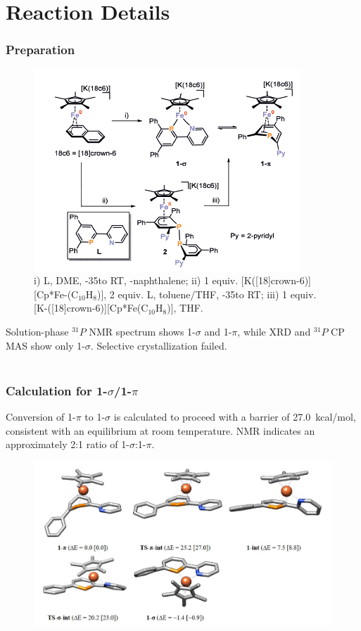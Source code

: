 \documentclass[10pt,aspectratio=43]{beamer}
\numberwithin{equation}{section}
\begin{document}
\section{Reaction Details}
\begin{frame}
\frametitle{Preparation}
\begin{figure}
	\centering
	\includegraphics[width=0.7\linewidth]{prep.jpg}
	\caption{i) L, DME, -35\textcelsius to RT, -naphthalene;
		     ii) 1 equiv. [K([18]crown-6)][Cp*Fe-(C$ _{10} $H$ _8 $)], 2 equiv. L, toluene/THF, -35\textcelsius to RT; 
		     iii) 1 equiv. [K-([18]crown-6)][Cp*Fe(C$ _{10} $H$ _8 $)], THF.}
\end{figure}
Solution-phase $ ^{31}P $ NMR spectrum shows 1-$ \sigma $ and 1-$ \pi $, while XRD and $ ^{31}P $ CP MAS show only 1-$ \sigma $.   Selective crystallization failed.\\
~\\

\end{frame}

\begin{frame}
\frametitle{Calculation for 1-$ \sigma $/1-$ \pi $}
Conversion of 1-$ \pi $ to 1-$ \sigma $ is calculated to proceed with a barrier of \SI{27.0}{kcal/mol}, consistent with an equilibrium at room temperature. NMR indicates an approximately 2:1 ratio of 1-$ \sigma $:1-$ \pi $.
\begin{figure}
	\includegraphics[width=\linewidth]{conver.jpg}
\end{figure}
\end{frame}
\end{document}
